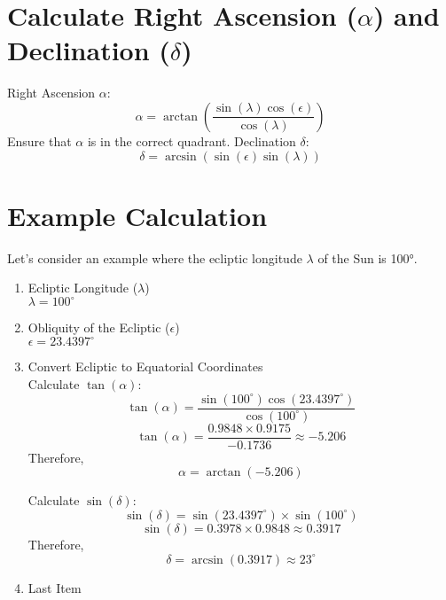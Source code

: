 \documentclass[12pt,a4paper]{article}
\begin{document}
	\section{Calculate Right Ascension (\(\alpha\)) and Declination (\(\delta\))}
	Right Ascension \(\alpha\):
	\[
	\alpha = \arctan \left( \frac{\sin(\lambda) \cos(\epsilon)}{\cos(\lambda)} \right)
	\]
	Ensure that \(\alpha\) is in the correct quadrant.
	Declination \(\delta\):
	\[
	\delta = \arcsin (\sin(\epsilon) \sin(\lambda))
	\]
	
	\section{Example Calculation} 
	
	Let’s consider an example where the ecliptic longitude \(\lambda\) of the Sun is 100°.
	
	\begin{enumerate}
	\item Ecliptic Longitude (\(\lambda\)) \\
		\(\lambda = 100^\circ\)
	\item Obliquity of the Ecliptic (\(\epsilon\)) \\
		\(\epsilon = 23.4397^\circ\)
		
	\item Convert Ecliptic to Equatorial Coordinates \\
		Calculate \(\tan(\alpha)\):
		\[
		\tan(\alpha) = \frac{\sin(100^\circ) \cos(23.4397^\circ)}{\cos(100^\circ)}
		\]
		\[
		\tan(\alpha) = \frac{0.9848 \times 0.9175}{-0.1736} \approx -5.206
		\]
		Therefore,
		\[
		\alpha = \arctan(-5.206)
		\]
		
		Calculate \(\sin(\delta)\):
		\[
		\sin(\delta) = \sin(23.4397^\circ) \times \sin(100^\circ)
		\]
		\[
		\sin(\delta) = 0.3978 \times 0.9848 \approx 0.3917
		\]
		Therefore,
		\[
		\delta = \arcsin(0.3917) \approx 23^\circ
		\]
	\item Last Item
	\end{enumerate}
	
%	
%	
%	
	
\end{document}
